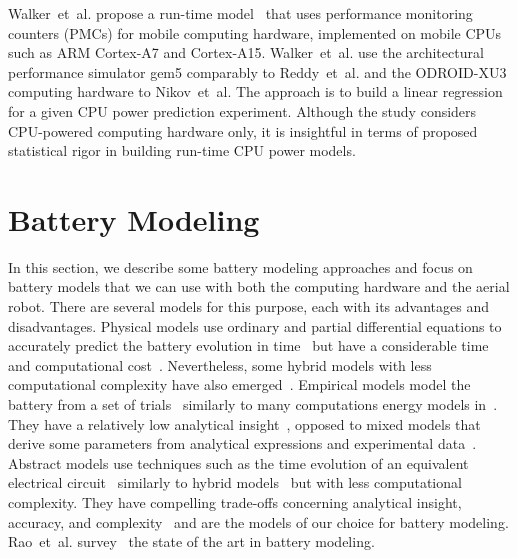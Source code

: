 Walker~et~al. propose a run-time model~\citep{walker2017accurate} that uses performance monitoring counters (PMCs) for mobile computing hardware, implemented on mobile CPUs such as ARM Cortex-A7 and Cortex-A15.  Walker~et~al. use the architectural performance simulator gem5 comparably to Reddy~et~al. and the ODROID-XU3 computing hardware to Nikov~et~al. The approach is to build a linear regression for a given CPU power prediction experiment. Although the study considers CPU-powered computing hardware only, it is insightful in terms of proposed statistical rigor in building run-time CPU power models.


\section{Battery Modeling}
\label{sec:soa-ene-bat}

In this section, we describe some battery modeling approaches and focus on battery models that we can use with both the computing hardware and the aerial robot. There are several models for this purpose, each with its advantages and disadvantages.
Physical models use ordinary and partial differential equations to accurately predict the battery evolution in time~\citep{rao2003battery} but have a considerable time and computational cost~\citep{doyle1993modeling,marcicki2013design,lotfi2017reduced,moura2017battery}. Nevertheless, some hybrid models with less computational complexity have also emerged~\citep{kim2011hybrid,kim2019enhanced}.  Empirical models model the battery from a set of trials~\citep{syracuse1997statistical,pedram1999design} similarly to many computations energy models in~. They have a relatively low analytical insight~\citep{rao2003battery}, opposed to mixed models that derive some parameters from analytical expressions and experimental data~\citep{rao2003battery,rakhmatov2001analytical}. Abstract models use techniques such as the time evolution of an equivalent electrical circuit~\citep{gold1997pspice,benini2001discrete,seongjun2008state,xiaosong2012comparative,xing2014state,hasan2018exogenous} similarly to hybrid models~\citep{kim2011hybrid} but with less computational complexity. They have compelling trade-offs concerning analytical insight, accuracy, and complexity~\citep{rao2003battery} and are the models of our choice for battery modeling. Rao~et~al. survey~\citep{rao2003battery} the state of the art in battery modeling.

